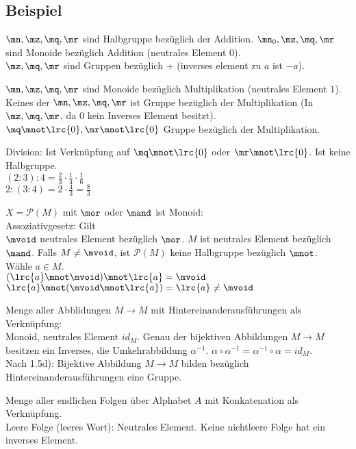 	\subsection{Beispiel}

		\item $\mn,\mz,\mq,\mr$ sind Halbgruppe bezüglich der Addition. $\mn_0,\mz,\mq,\mr$ sind Monoide bezüglich Addition (neutrales Element $0$).\\
		$\mz,\mq,\mr$ sind Gruppen bezüglich $+$ (inverses element zu $a$ ist $-a$).
		\item $\mn,\mz,\mq,\mr$ sind Monoide bezüglich Multiplikation (neutrales Element $1$). Keines der $\mn,\mz,\mq,\mr$ ist Gruppe bezüglich der Multiplikation (In $\mz,\mq,\mr$, da $0$ kein Inverses Element besitzt). $\mq\mnot\lrc{0},\mr\mnot\lrc{0}$ Gruppe bezüglich der Multiplikation.
		\item Division: Ist Verknüpfung auf $\mq\mnot\lrc{0}$ oder $\mr\mnot\lrc{0}$. Ist keine Halbgruppe.\\
		$(2:3):4=\frac{2}{3}\cdot\frac{1}{4}\cdot\frac{1}{6}$\\
		$2:(3:4)=2\cdot\frac{4}{3}=\frac{8}{3}$
		\item $X=\mathcal{P}(M)$ mit $\mor$ oder $\mand$ ist Monoid:\\
		Assoziativgesetz: Gilt\\
		$\mvoid$ neutrales Element bezüglich $\mor$. $M$ ist neutrales Element bezüglich $\mand$. Falls $M\neq\mvoid$, ist $\mathcal{P}(M)$ keine Halbgruppe bezüglich $\mnot$.\\
		Wähle $a\in M$.\\
		$(\lrc{a}\mnot\mvoid)\mnot\lrc{a}=\mvoid$\\
		$\lrc{a}\mnot(\mvoid\mnot\lrc{a})=\lrc{a}\neq\mvoid$
		\item Menge aller Abblidungen $M\rightarrow M$ mit Hintereinanderausführungen als Verknüpfung:\\
		Monoid, neutrales Element $id_M$. Genau der bijektiven Abbildungen $M\rightarrow M$ besitzen ein Inverses, die Umkehrabbildung $\alpha^{-1}$. $\alpha\circ\alpha^{-1}=\alpha^{-1}\circ\alpha=id_M$.\\
		Nach 1.5d): Bijektive Abbildung $M\rightarrow M$ bilden bezüglich Hintereinanderausführungen eine Gruppe.
		\item Menge aller endlichen Folgen über Alphabet $A$ mit Konkatenation als Verknüpfung.\\
		Leere Folge (leeres Wort): Neutrales Element. Keine nichtleere Folge hat ein inverses Element.
